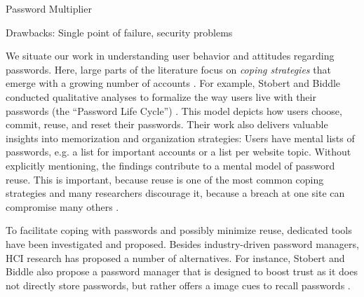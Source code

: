	Password Multiplier \cite{Halderman2005ConvenientPWM}
	
	Drawbacks: Single point of failure, security problems 
	
	We situate our work in understanding user behavior and attitudes regarding passwords. Here, large parts of the literature focus on \textit{coping strategies} that emerge with a growing number of accounts \cite{Florencio2007LargeScaleStudyPasswordHabits, Florencio2014PasswordPortfoliosFiniteUser}. For example, Stobert and Biddle conducted qualitative analyses to formalize the way users live with their passwords (the ``Password Life Cycle'') \cite{Stobert2014PasswordLifeCycle}. This model depicts how users choose, commit, reuse, and reset their passwords. Their work also delivers valuable insights into memorization and organization strategies: Users have mental lists of passwords, e.g. a list for important accounts or a list per website topic. Without explicitly mentioning, the findings contribute to a mental model of password reuse. This is important, because reuse is one of the most common coping strategies \cite{Das2014TangledWeb, Gaw2006PasswordManagement, Hayashi2011DiaryStudyPWs} and many researchers discourage it, because a breach at one site can compromise many others \cite{Bonneau2012ScienceOfGuessing, Komanduri2011OfPasswordsAndPeople}. 
	
	To facilitate coping with passwords and possibly minimize reuse, dedicated tools have been investigated and proposed. Besides industry-driven password managers, HCI research has proposed a number of alternatives. For instance, Stobert and Biddle also propose a password manager that is designed to boost trust as it does not directly store passwords, but rather offers a image cues to recall passwords \cite{Stobert2014PWMThatDoesntRemember}. 
	
	
	\cite{Bojinov2010KamouflagePWM}
	
	\cite{Fagan2017UsersConsiderationsPWMs}